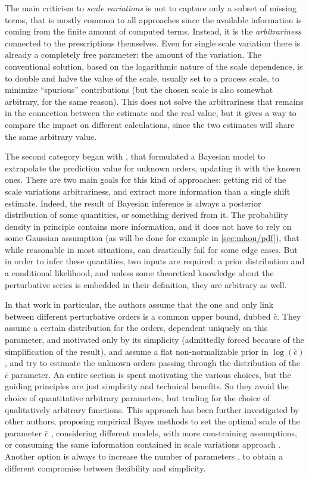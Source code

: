 The main criticism to \textit{scale variations} is not to capture only a subset
of missing terms, that is mostly common to all approaches since the available
information is coming from the finite amount of computed terms.
Instead, it is the \textit{arbitrariness} connected to the prescriptions
themselves.
%
Even for single scale variation there is already a completely free parameter:
the amount of the variation.
%
The conventional solution, based on the logarithmic nature of the scale
dependence, is to double and halve the value of the scale, usually set to a
process scale, to minimize \enquote{spurious} contributions (but the chosen
scale is also somewhat arbitrary, for the same reason).
%
This does not solve the arbitrariness that remains in the connection between
the estimate and the real value, but it gives a way to compare the impact on
different calculations, since the two estimates will share the same arbitrary
value.

The second category began with \cite{Cacciari:2011ze}, that formulated a
Bayesian model to extrapolate the prediction value for unknown orders, updating
it with the known ones.
%
There are two main goals for this kind of approaches: getting rid of the
scale variations arbitrariness, and extract more information than a single
shift estimate.
Indeed, the result of Bayesian inference is always a posterior distribution of
some quantities, or something derived from it.
%
The probability density in principle contains more information, and it does not
have to rely on some Gaussian assumption (as will be done for example in
\cref{sec:mhou/pdf}), that while reasonable in most situations, can drastically
fail for some edge cases.
%
But in order to infer these quantities, two inputs are required: a prior
distribution and a conditional likelihood, and unless some theoretical
knowledge about the perturbative series is embedded in their definition, they
are arbitrary as well.

In that work in particular, the authors assume that the one and only link
between different perturbative orders is a common upper bound, dubbed
$\bar{c}$.
They assume a certain distribution for the orders, dependent uniquely on this
parameter, and motivated only by its simplicity (admittedly forced because of
the simplification of the result), and assume a flat non-normalizable prior in
$\log(\bar{c})$, and try to estimate the unknown orders passing through the
distribution of the $\bar{c}$ parameter.
%
An entire section is spent motivating the various choices, but the guiding
principles are just simplicity and technical benefits.
So they avoid the choice of quantitative arbitrary parameters, but trading for
the choice of qualitatively arbitrary functions.
%
This approach has been further investigated by other authors, proposing
empirical Bayes methods to set the optimal scale of the parameter $\bar{c}$
\cite{Forte:2013mda}, considering different models, with more constraining
assumptions, or consuming the same information contained in scale variations
approach \cite{Bonvini:2020xeo}.
Another option is always to increase the number of parameters
\cite{Duhr:2021mfd}, to obtain a different compromise between flexibility and
simplicity.

